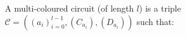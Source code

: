 \documentclass[preview]{standalone}
\begin{document}
\begin{center}
A multi-coloured circuit (of length $l$) is a triple $\mathcal{C} = ((a_i)_{i=0}^{l-1}, (C_{a_i}), (D_{a_i}))$ such that:
\end{center}
\end{document}
